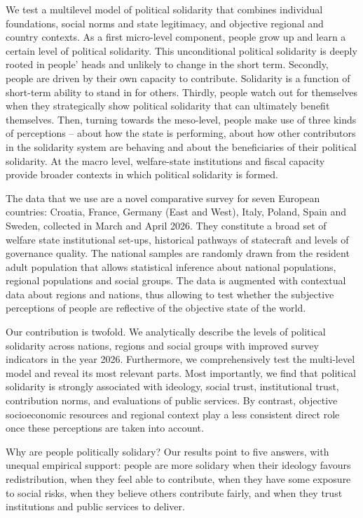 \documentclass[12pt]{article}
\begin{document}
We test a multilevel model of political solidarity that combines
individual foundations, social norms and state legitimacy, and objective
regional and country contexts. As a first micro-level component, people
grow up and learn a certain level of political solidarity. This
unconditional political solidarity is deeply rooted in people' heads and
unlikely to change in the short term. Secondly, people are driven by
their own capacity to contribute. Solidarity is a function of short-term
ability to stand in for others. Thirdly, people watch out for themselves
when they strategically show political solidarity that can ultimately
benefit themselves. Then, turning towards the meso-level, people make
use of three kinds of perceptions -- about how the state is performing,
about how other contributors in the solidarity system are behaving and
about the beneficiaries of their political solidarity. At the macro
level, welfare-state institutions and fiscal capacity provide broader
contexts in which political solidarity is formed.

The data that we use are a novel comparative survey for seven European
countries: Croatia, France, Germany (East and West), Italy, Poland,
Spain and Sweden, collected in March and April 2026. They constitute a
broad set of welfare state institutional set-ups, historical pathways of
statecraft and levels of governance quality. The national samples are
randomly drawn from the resident adult population that allows
statistical inference about national populations, regional populations
and social groups. The data is augmented with contextual data about
regions and nations, thus allowing to test whether the subjective
perceptions of people are reflective of the objective state of the
world.

Our contribution is twofold. We analytically describe the levels of
political solidarity across nations, regions and social groups with
improved survey indicators in the year 2026. Furthermore, we
comprehensively test the multi-level model and reveal its most relevant
parts. Most importantly, we find that political solidarity is strongly
associated with ideology, social trust, institutional trust,
contribution norms, and evaluations of public services. By contrast,
objective socioeconomic resources and regional context play a less
consistent direct role once these perceptions are taken into account.

Why are people politically solidary? Our results point to five answers,
with unequal empirical support: people are more solidary when their
ideology favours redistribution, when they feel able to contribute, when
they have some exposure to social risks, when they believe others
contribute fairly, and when they trust institutions and public services
to deliver.
\end{document}
